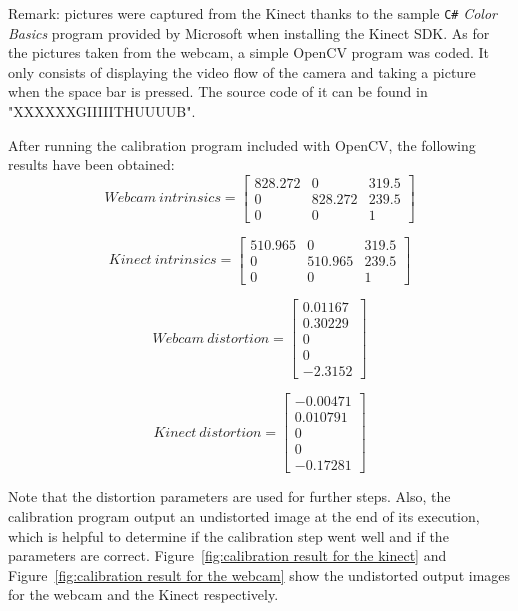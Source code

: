 Remark: pictures were captured from the Kinect thanks to the sample \texttt{C\#} \textit{Color Basics} program provided by Microsoft when installing the Kinect SDK. As for the pictures taken from the webcam, a simple OpenCV program was coded. It only consists of displaying the video flow of the camera and taking a picture when the space bar is pressed. The source code of it can be found in "XXXXXXGIIIIITHUUUUB".

After running the calibration program included with OpenCV, the following results have been obtained:\\

\begin{equation}
  Webcam\:intrinsics = \begin{bmatrix}
       828.272 & 0 & 319.5 \\
       0 & 828.272 & 239.5 \\
       0 & 0 & 1
     \end{bmatrix} 
\end{equation}

\begin{equation}
  Kinect\:intrinsics = \begin{bmatrix}
       510.965 & 0 & 319.5 \\
       0 & 510.965 & 239.5 \\
       0 & 0 & 1
     \end{bmatrix} 
\end{equation}

\begin{equation}
  Webcam\:distortion = \begin{bmatrix}
       0.01167 \\
       0.30229  \\
       0 \\
       0 \\
       -2.3152 
     \end{bmatrix} 
\end{equation}

\begin{equation}
  Kinect\:distortion = \begin{bmatrix}
       -0.00471 \\
       0.010791 \\
       0 \\
       0 \\
       -0.17281
     \end{bmatrix} 
\end{equation}

Note that the distortion parameters are used for further steps. Also, the calibration program output an undistorted image at the end of its execution, which is helpful to determine if the calibration step went well and if the parameters are correct. Figure~\ref{fig:calibration result for the kinect} and Figure~\ref{fig:calibration result for the webcam} show the undistorted output images for the webcam and the Kinect respectively.        

